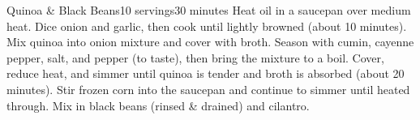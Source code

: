 \begin{recipe}{Quinoa \& Black Beans}{10 servings}{30 minutes}
Heat oil in a saucepan over medium heat. Dice onion and garlic, then cook until lightly browned (about 10 minutes).
Mix quinoa into onion mixture and cover with broth. Season with cumin, cayenne pepper, salt, and pepper (to taste), then bring the mixture to a boil. Cover, reduce heat, and simmer until quinoa is tender and broth is absorbed (about 20 minutes).
Stir frozen corn into the saucepan and continue to simmer until heated through. Mix in black beans (rinsed \& drained) and cilantro.
\end{recipe}
